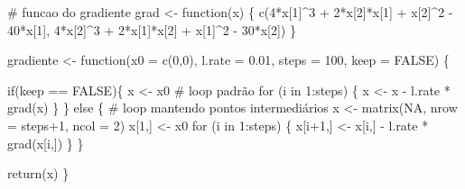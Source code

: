 \documentclass[
  a4paperpaper,
]{article}
\newenvironment{Shaded}{\begin{snugshade}}{\end{snugshade}}
\newcommand{\AttributeTok}[1]{\textcolor[rgb]{0.40,0.45,0.13}{#1}}
\newcommand{\CommentTok}[1]{\textcolor[rgb]{0.37,0.37,0.37}{#1}}
\newcommand{\ConstantTok}[1]{\textcolor[rgb]{0.56,0.35,0.01}{#1}}
\newcommand{\ControlFlowTok}[1]{\textcolor[rgb]{0.00,0.23,0.31}{#1}}
\newcommand{\DecValTok}[1]{\textcolor[rgb]{0.68,0.00,0.00}{#1}}
\newcommand{\FloatTok}[1]{\textcolor[rgb]{0.68,0.00,0.00}{#1}}
\newcommand{\FunctionTok}[1]{\textcolor[rgb]{0.28,0.35,0.67}{#1}}
\newcommand{\NormalTok}[1]{\textcolor[rgb]{0.00,0.23,0.31}{#1}}
\newcommand{\OtherTok}[1]{\textcolor[rgb]{0.00,0.23,0.31}{#1}}
\newcommand{\SpecialCharTok}[1]{\textcolor[rgb]{0.37,0.37,0.37}{#1}}
\begin{document}
\begin{Shaded}
\begin{Highlighting}[]
\CommentTok{\# funcao do gradiente}
\NormalTok{grad }\OtherTok{\textless{}{-}} \ControlFlowTok{function}\NormalTok{(x) \{}
    \FunctionTok{c}\NormalTok{(}\DecValTok{4}\SpecialCharTok{*}\NormalTok{x[}\DecValTok{1}\NormalTok{]}\SpecialCharTok{\^{}}\DecValTok{3} \SpecialCharTok{+} \DecValTok{2}\SpecialCharTok{*}\NormalTok{x[}\DecValTok{2}\NormalTok{]}\SpecialCharTok{*}\NormalTok{x[}\DecValTok{1}\NormalTok{] }\SpecialCharTok{+}\NormalTok{ x[}\DecValTok{2}\NormalTok{]}\SpecialCharTok{\^{}}\DecValTok{2} \SpecialCharTok{{-}} \DecValTok{40}\SpecialCharTok{*}\NormalTok{x[}\DecValTok{1}\NormalTok{],}
      \DecValTok{4}\SpecialCharTok{*}\NormalTok{x[}\DecValTok{2}\NormalTok{]}\SpecialCharTok{\^{}}\DecValTok{3} \SpecialCharTok{+} \DecValTok{2}\SpecialCharTok{*}\NormalTok{x[}\DecValTok{1}\NormalTok{]}\SpecialCharTok{*}\NormalTok{x[}\DecValTok{2}\NormalTok{] }\SpecialCharTok{+}\NormalTok{ x[}\DecValTok{1}\NormalTok{]}\SpecialCharTok{\^{}}\DecValTok{2} \SpecialCharTok{{-}} \DecValTok{30}\SpecialCharTok{*}\NormalTok{x[}\DecValTok{2}\NormalTok{])}
\NormalTok{  \}}

\NormalTok{gradiente }\OtherTok{\textless{}{-}} \ControlFlowTok{function}\NormalTok{(}\AttributeTok{x0 =} \FunctionTok{c}\NormalTok{(}\DecValTok{0}\NormalTok{,}\DecValTok{0}\NormalTok{), }\AttributeTok{l.rate =} \FloatTok{0.01}\NormalTok{, }\AttributeTok{steps =} \DecValTok{100}\NormalTok{, }\AttributeTok{keep =} \ConstantTok{FALSE}\NormalTok{) \{}
  
  \ControlFlowTok{if}\NormalTok{(keep }\SpecialCharTok{==} \ConstantTok{FALSE}\NormalTok{)\{}
\NormalTok{    x }\OtherTok{\textless{}{-}}\NormalTok{ x0}
    \CommentTok{\# loop padrão}
    \ControlFlowTok{for}\NormalTok{ (i }\ControlFlowTok{in} \DecValTok{1}\SpecialCharTok{:}\NormalTok{steps) \{}
\NormalTok{      x }\OtherTok{\textless{}{-}}\NormalTok{ x }\SpecialCharTok{{-}}\NormalTok{ l.rate }\SpecialCharTok{*} \FunctionTok{grad}\NormalTok{(x)}
\NormalTok{    \}}
\NormalTok{  \} }\ControlFlowTok{else}\NormalTok{ \{}
      \CommentTok{\# loop mantendo pontos intermediários}
\NormalTok{      x }\OtherTok{\textless{}{-}} \FunctionTok{matrix}\NormalTok{(}\ConstantTok{NA}\NormalTok{, }\AttributeTok{nrow =}\NormalTok{ steps}\SpecialCharTok{+}\DecValTok{1}\NormalTok{, }\AttributeTok{ncol =} \DecValTok{2}\NormalTok{)}
\NormalTok{      x[}\DecValTok{1}\NormalTok{,] }\OtherTok{\textless{}{-}}\NormalTok{ x0}
      \ControlFlowTok{for}\NormalTok{ (i }\ControlFlowTok{in} \DecValTok{1}\SpecialCharTok{:}\NormalTok{steps) \{}
\NormalTok{        x[i}\SpecialCharTok{+}\DecValTok{1}\NormalTok{,] }\OtherTok{\textless{}{-}}\NormalTok{ x[i,] }\SpecialCharTok{{-}}\NormalTok{ l.rate }\SpecialCharTok{*} \FunctionTok{grad}\NormalTok{(x[i,])}
\NormalTok{      \}}
\NormalTok{  \}}
  
  \FunctionTok{return}\NormalTok{(x)}
\NormalTok{\}}
\end{Highlighting}
\end{Shaded}
\end{document}
